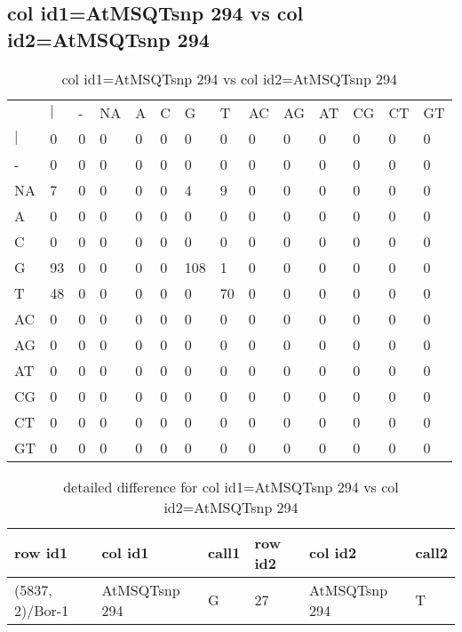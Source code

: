 \subsection{col id1=AtMSQTsnp 294 vs col id2=AtMSQTsnp 294}
\begin{center}
\begin{longtable}{|l|l|l|l|l|l|l|l|l|l|l|l|l|l|}
\caption{col id1=AtMSQTsnp 294 vs col id2=AtMSQTsnp 294} \label{table_dm830}\\
\hline
\\
\hline
&$|$&-&NA&A&C&G&T&AC&AG&AT&CG&CT&GT\\
$|$&0&0&0&0&0&0&0&0&0&0&0&0&0\\
-&0&0&0&0&0&0&0&0&0&0&0&0&0\\
NA&7&0&0&0&0&4&9&0&0&0&0&0&0\\
A&0&0&0&0&0&0&0&0&0&0&0&0&0\\
C&0&0&0&0&0&0&0&0&0&0&0&0&0\\
G&93&0&0&0&0&108&1&0&0&0&0&0&0\\
T&48&0&0&0&0&0&70&0&0&0&0&0&0\\
AC&0&0&0&0&0&0&0&0&0&0&0&0&0\\
AG&0&0&0&0&0&0&0&0&0&0&0&0&0\\
AT&0&0&0&0&0&0&0&0&0&0&0&0&0\\
CG&0&0&0&0&0&0&0&0&0&0&0&0&0\\
CT&0&0&0&0&0&0&0&0&0&0&0&0&0\\
GT&0&0&0&0&0&0&0&0&0&0&0&0&0\\
\hline
\end{longtable}
\end{center}

\begin{center}
\begin{longtable}{|l|l|l|l|l|l|}
\caption{detailed difference for col id1=AtMSQTsnp 294 vs col id2=AtMSQTsnp 294} \label{table_dm831}\\
\hline
row id1&col id1&call1&row id2&col id2&call2\\
\hline
(5837, 2)/Bor-1&AtMSQTsnp 294&G&27&AtMSQTsnp 294&T\\
\hline
\end{longtable}
\end{center}

